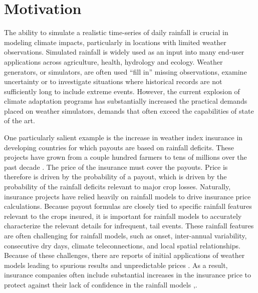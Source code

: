\documentclass[12pt]{article}
\begin{document}
\newpage




\section{Motivation}

The ability to simulate a realistic time-series of daily rainfall is crucial in modeling climate impacts, particularly in locations with limited weather observations.   Simulated rainfall is widely used as an input into many end-user applications across agriculture, health, hydrology and ecology.  Weather generators, or simulators, are often used ``fill in'' missing observations, examine uncertainty or to investigate situations where historical records are not sufficiently long to include extreme events.   However, the current explosion of climate adaptation programs has substantially increased the practical demands placed on weather simulators, demands that often exceed the capabilities of state of the art.  

One particularly salient example is the increase in weather index insurance in developing countries for which payouts are based on rainfall deficits.  These projects have grown from a couple hundred farmers to tens of millions over the past decade \citep{Greatrex2015}.   The price of the insurance must cover the payouts.  Price is therefore is driven by the probability of a payout, which is driven by the probability of the rainfall deficits relevant to major crop losses. Naturally, insurance projects have relied heavily on rainfall models to drive insurance price calculations.  Because payout formulas are closely tied to specific rainfall features relevant to the crops insured, it is important for rainfall models to accurately characterize the relevant details for infrequent, tail events.  These rainfall features are often challenging for rainfall models, such as onset, inter-annual variability, consecutive dry days, climate teleconnections, and local spatial relationships. Because of these challenges, there are reports of initial applications of weather models leading to spurious results and unpredictable prices \citep{Giannini2009}.  As a result, insurance companies often include substantial increases in the insurance price to protect against their lack of confidence in the rainfall models \citep{Osgood2012},.
\end{document}
